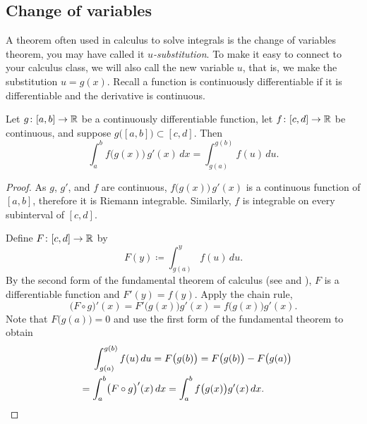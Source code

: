 \subsection{Change of variables}

A theorem often used in calculus to solve integrals is the change of
variables theorem, you may have called it
\emph{$u$-substitution}.
To make it easy to connect to your calculus class, we will also
call the new variable $u$, that is, we make the substitution $u=g(x)$.
Recall a function is continuously differentiable if
it is differentiable and the derivative is continuous.

\begin{thm}
Let $g \colon [a,b] \to {\mathbb{R}}$ be a continuously differentiable function,
let $f \colon [c,d] \to {\mathbb{R}}$ be continuous, and suppose
$g\bigl([a,b]\bigr) \subset [c,d]$.  Then
\begin{equation*}
\int_a^b f\bigl(g(x)\bigr)\, g'(x)\, dx =
\int_{g(a)}^{g(b)} f(u)\, du .
\end{equation*}
\end{thm}

\begin{proof}
As $g$, $g'$, and $f$ are continuous, $f\bigl(g(x)\bigr)\,g'(x)$
is a continuous function of $[a,b]$, therefore it is Riemann integrable.
Similarly, $f$ is integrable on every subinterval of $[c,d]$.

Define $F \colon [c,d] \to {\mathbb{R}}$ by
\begin{equation*}
F(y) \coloneqq \int_{g(a)}^{y} f(u)\,du .
\end{equation*}
By the second form of the fundamental
theorem of calculus
(see  and ),
$F$ is a differentiable function and $F'(y) = f(y)$.  Apply the chain
rule,
\begin{equation*}
\bigl( F \circ g \bigr)' (x) =
F'\bigl(g(x)\bigr) g'(x)
=
f\bigl(g(x)\bigr) g'(x) .
\end{equation*}
Note that $F\bigl(g(a)\bigr) = 0$ and
use the first form of the fundamental theorem
to obtain
\begin{multline*}
\qquad %
\int_{g(a)}^{g(b)} f(u)\,du = F\bigl(g(b)\bigr) = F\bigl(g(b)\bigr)-F\bigl(g(a)\bigr)
\\
=
\int_a^b 
\bigl( F \circ g \bigr)' (x) \,dx
=
\int_a^b 
f\bigl(g(x)\bigr) g'(x)
\,dx .
\qquad %
\qedhere
\end{multline*}
\end{proof}

